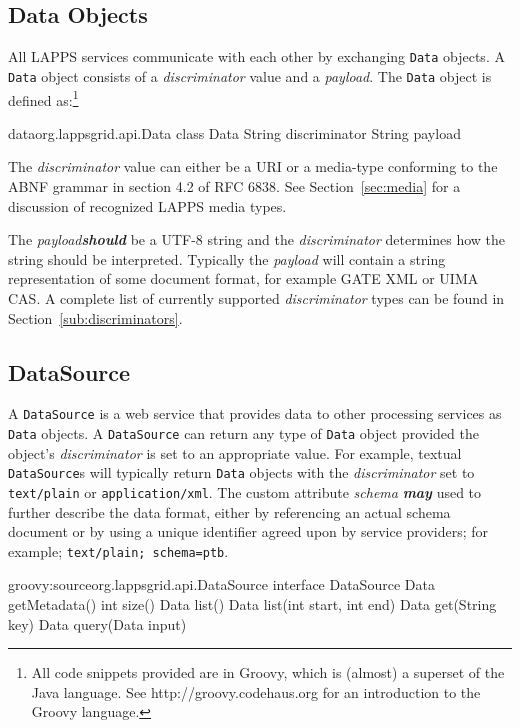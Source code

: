 \documentclass{article}
\newcommand{\lapps}{LAPPS\xspace}
\newcommand{\data}{\texttt{Data}\xspace}
\newcommand{\source}{\texttt{DataSource}\xspace}
\newcommand{\discriminator}{\textit{discriminator}\xspace}
\newcommand{\payload}{\textit{payload}\xspace}
\newcommand{\definedterm}[1]{\textbf{\textit{#1}}\xspace}
\newcommand{\should}{\definedterm{should}}
\newcommand{\may}{\definedterm{may}}
\renewcommand{\tt}[1]{\texttt{#1}}
\begin{document}

\subsection{Data Objects}
All \lapps services communicate with each other by exchanging \data objects.  A \data object consists of a \discriminator value and a \payload.  The \data object is defined as:\footnote{All code snippets provided are in Groovy, which is (almost) a superset of the Java language.  See http://groovy.codehaus.org for an introduction to the Groovy language.}

\begin{groovy}{data}{org.lappsgrid.api.Data}
	class Data {
		String discriminator
		String payload
	}
\end{groovy}

The \discriminator value can either be a URI or a media-type conforming to the ABNF grammar in section 4.2 of RFC 6838\cite{rfc6838}. See Section~\ref{sec:media} for a discussion of recognized \lapps media types.

The \payload \should be a UTF-8 string and the \discriminator determines how the string should be interpreted.  Typically the \payload will contain a string representation of some document format, for example GATE XML or UIMA CAS.  A complete list of currently supported \discriminator types can be found in Section~\ref{sub:discriminators}. 


\subsection{DataSource}

A \source is a web service that provides data to other processing services as \data objects. A \source can return any type of \data object provided the object's \discriminator is set to an appropriate value.  For example, textual \source{}s will typically return \data objects with the \discriminator set to \tt{text/plain} or \tt{application/xml}. The custom attribute \emph{schema}  \may used to further describe the data format, either by referencing an actual schema document or by using a unique identifier agreed upon by service providers; for example; \tt{text/plain; schema=ptb}.

\begin{groovy}{groovy:source}{org.lappsgrid.api.DataSource}
	interface DataSource {
		Data getMetadata()
		int size()
		Data list()
		Data list(int start, int end)
		Data get(String key)
		Data query(Data input)
	}
\end{groovy}
\end{document}

